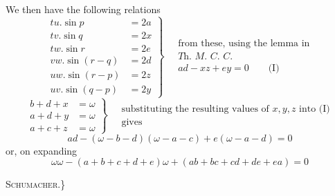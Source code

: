 %
\par
We then have the following relations
\[
\left.\begin{aligned}
tu.\sin p&=2a\\ tv.\sin q&=2x\\ tw.\sin r&=2e\\
vw.\sin(r-q)&=2d\\ uw.\sin(r-p)&=2z\\ uv.\sin(q-p)&=2y
\end{aligned}\right\}\quad
\begin{gathered}\text{from these, using the lemma in}\\
\textit{Th. M. C. C.}\\ ad-xz+ey=0\qquad\text{(I)}\end{gathered}
\]
\begingroup\small
\[
\left.\begin{aligned}b+d+x&=\omega\\a+d+y&=\omega\\a+c+z&=\omega\end{aligned}\right\}\quad
\begin{gathered}\text{substituting the resulting values of }x,y,z\text{ into (I)}\\\text{gives}\end{gathered}
\]
\endgroup
\[ad-(\omega-b-d)(\omega-a-c)+e(\omega-a-d)=0\]
or, on expanding
\[\omega\omega-(a+b+c+d+e)\omega+(ab+bc+cd+de+ea)=0\]
\begin{flushright}\textsc{Schumacher}.\}\end{flushright}

